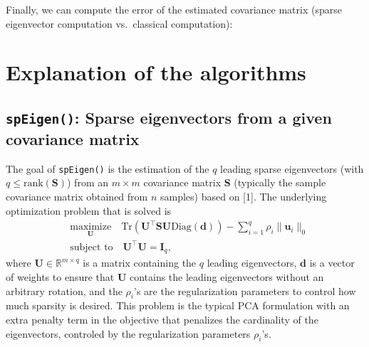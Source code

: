 \documentclass[]{article}
\newenvironment{Shaded}{\begin{snugshade}}{\end{snugshade}}
\newcommand{\KeywordTok}[1]{\textcolor[rgb]{0.13,0.29,0.53}{\textbf{#1}}}
\newcommand{\DataTypeTok}[1]{\textcolor[rgb]{0.13,0.29,0.53}{#1}}
\newcommand{\StringTok}[1]{\textcolor[rgb]{0.31,0.60,0.02}{#1}}
\newcommand{\CommentTok}[1]{\textcolor[rgb]{0.56,0.35,0.01}{\textit{#1}}}
\newcommand{\OperatorTok}[1]{\textcolor[rgb]{0.81,0.36,0.00}{\textbf{#1}}}
\newcommand{\NormalTok}[1]{#1}
\begin{document}
Finally, we can compute the error of the estimated covariance matrix
(sparse eigenvector computation vs.~classical computation):

\begin{Shaded}
\end{Shaded}

\section{Explanation of the
algorithms}\label{explanation-of-the-algorithms}

\subsection{\texorpdfstring{\texttt{spEigen()}: Sparse eigenvectors from
a given covariance
matrix}{spEigen(): Sparse eigenvectors from a given covariance matrix}}\label{speigen-sparse-eigenvectors-from-a-given-covariance-matrix}

The goal of \texttt{spEigen()} is the estimation of the \(q\) leading
sparse eigenvectors (with \(q \leq \text{rank}(\mathbf{S})\)) from an
\(m\times m\) covariance matrix \(\mathbf{S}\) (typically the sample
covariance matrix obtained from \(n\) samples) based on {[}1{]}. The
underlying optimization problem that is solved is \[\begin{aligned}
      &\underset{\mathbf{U}}{\text{maximize}}\quad \text{Tr} \left(\mathbf{U}^\top \mathbf{S} \mathbf{U} \text{Diag}   (\mathbf{d})\right) - \sum_{i=1}^{q}\rho_i\|\mathbf{u}_i\|_0\\
    &\text{subject to}\quad \mathbf{U}^\top\mathbf{U}=\mathbf{I}_q,
  \end{aligned}\] where \(\mathbf{U}\in\mathbb{R}^{m\times q}\) is a
matrix containing the \(q\) leading eigenvectors, \(\mathbf{d}\) is a
vector of weights to ensure that \(\mathbf{U}\) contains the leading
eigenvectors without an arbitrary rotation, and the \(\rho_i\)'s are the
regularization parameters to control how much sparsity is desired. This
problem is the typical PCA formulation with an extra penalty term in the
objective that penalizes the cardinality of the eigenvectors, controled
by the regularization parameters \(\rho_i\)'s.
\end{document}
